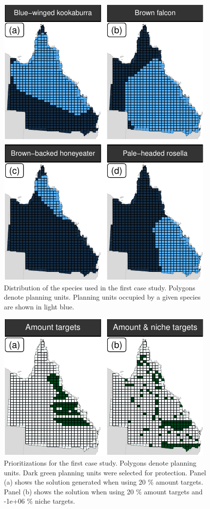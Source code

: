 \begin{figure}
\centering
\includegraphics{figures_files/figure-latex/unnamed-chunk-7-1.pdf}
\caption{Distribution of the species used in the first case study.
Polygons denote planning units. Planning units occupied by a given
species are shown in light blue.}
\end{figure}

\begin{figure}
\centering
\includegraphics{figures_files/figure-latex/unnamed-chunk-8-1.pdf}
\caption{Prioritizations for the first case study. Polygons denote
planning units. Dark green planning units were selected for protection.
Panel (a) shows the solution generated when using 20 \% amount targets.
Panel (b) shows the solution when using 20 \% amount targets and -1e+06
\% niche targets.}
\end{figure}

